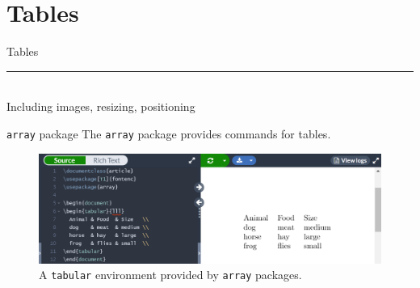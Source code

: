 \documentclass{beamer}
\begin{document}
{  

  \section{Tables}

  \begin{frame}[plain]
    \vfill
    \centering
    \begin{beamercolorbox}[sep=8pt,center,shadow=true,rounded=true]{Tables}
      \insertsectionhead\par%
      \color{davisblue}\noindent\rule{10cm}{1pt} \\
      \footnotesize{Including images, resizing, positioning}
    \end{beamercolorbox}
    \vfill
  \end{frame}

  \begin{frame}{\texttt{array} package}
    The \texttt{array} package provides commands for tables.
    \begin{figure}
      \includegraphics[width=0.9\linewidth]{day01-overleaf-11A-table.png}
      \caption{A \texttt{tabular} environment provided by \texttt{array} packages.}
      \label{fig:day01-overleaf-11A}
    \end{figure}
  \end{frame}

}
\end{document}
